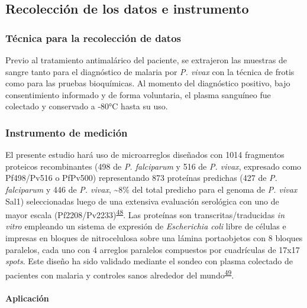 \documentclass[a4paper]{article}
\let\oldparagraph\paragraph
\renewcommand{\paragraph}[1]{\oldparagraph{#1}\mbox{}}
\begin{document}
\subsection{Recolección de los datos e
instrumento}\label{recoleccion-de-los-datos-e-instrumento}

\subsubsection{Técnica para la recolección de
datos}\label{tecnica-para-la-recoleccion-de-datos}

Previo al tratamiento antimalárico del paciente, se extrajeron las
muestras de sangre tanto para el diagnóstico de malaria por \emph{P.
vivax} con la técnica de frotis como para las pruebas bioquímicas. Al
momento del diagnóstico positivo, bajo consentimiento informado y de
forma voluntaria, el plasma sanguíneo fue colectado y conservado a -80°C
hasta su uso.

\subsubsection{Instrumento de medición}\label{instrumento-de-medicion}

El presente estudio hará uso de microarreglos diseñados con 1014
fragmentos proteicos recombinantes (498 de \emph{P. falciparum} y 516 de
\emph{P. vivax}, expresado como Pf498/Pv516 o PfPv500) representando 873
proteínas predichas (427 de \emph{P. falciparum} y 446 de \emph{P.
vivax}, \textasciitilde{}8\% del total predicho para el genoma de
\emph{P. vivax} Sal1) seleccionadas luego de una extensiva evaluación
serológica con uno de mayor escala
(Pf2208/Pv2233)\textsuperscript{\protect\hyperlink{ref-Finney2014}{48}}.
Las proteínas son transcritas/traducidas \emph{in vitro} empleando un
sistema de expresión de \emph{Escherichia coli} libre de células e
impresas en bloques de nitrocelulosa sobre una lámina portaobjetos con 8
bloques paralelos, cada uno con 4 arreglos paralelos compuestos por
cuadrículas de 17x17 \emph{spots}. Este diseño ha sido validado mediante
el sondeo con plasma colectado de pacientes con malaria y controles
sanos alrededor del
mundo\textsuperscript{\protect\hyperlink{ref-King2015FOC}{49}}.

\paragraph{Aplicación}\label{aplicacion}
\end{document}
